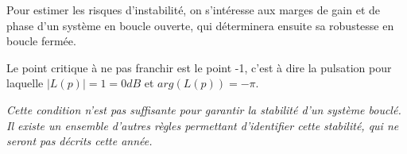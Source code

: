\documentclass[a4paper,french]{paper}
\begin{document}
Pour estimer les risques d'instabilité, on s'intéresse aux marges de gain et de phase d'un système en boucle ouverte, qui déterminera ensuite sa robustesse en boucle fermée.

Le point critique à ne pas franchir est le point -1, c'est à dire la pulsation pour laquelle $\lvert L(p) \rvert = 1 = 0dB$ et $arg(L(p)) = -\pi$. 

\qquad

\textit{Cette condition n'est pas suffisante pour garantir la stabilité d'un système bouclé. Il existe un ensemble d'autres règles permettant d'identifier cette stabilité, qui ne seront pas décrits cette année.}



\end{document}
